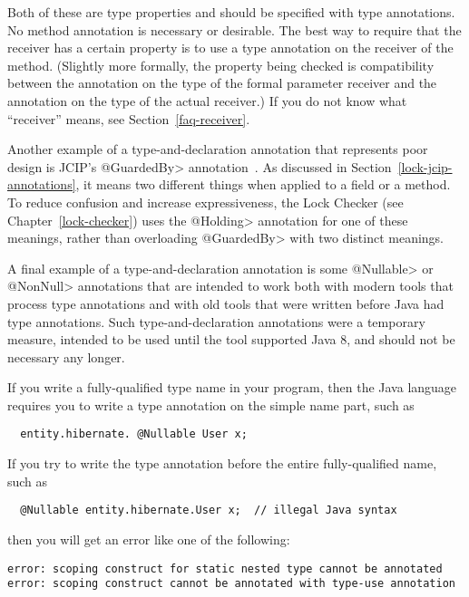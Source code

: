 Both of these are type properties and should be specified with type
annotations.  No method annotation is necessary or desirable.  The best way
to require that the receiver has a certain property is to use a type
annotation on the receiver of the method.  (Slightly more formally, the
property being checked is compatibility between the annotation on the type
of the formal parameter receiver and the annotation on the type of the
actual receiver.)  If you do not know what ``receiver'' means, see
Section~\ref{faq-receiver}.

Another example of a type-and-declaration annotation that represents poor
design is JCIP's \<@GuardedBy> annotation~\cite{Goetz2006}.  As discussed
in Section~\ref{lock-jcip-annotations}, it means two different things when
applied to a field or a method.  To reduce confusion and increase
expressiveness, the Lock Checker (see Chapter~\ref{lock-checker}) uses the
\<@Holding> annotation for one of these meanings, rather than overloading
\<@GuardedBy> with two distinct meanings.


A final example of a type-and-declaration annotation is some \<@Nullable>
or \<@NonNull> annotations that are intended to work both with modern tools
that process type annotations and with old tools that were written before
Java had type annotations.  Such type-and-declaration annotations were a
temporary measure, intended to be used until the tool supported Java 8, and
should not be necessary any longer.



If you write a fully-qualified type name in your program, then the Java
language requires you to write a type annotation on the simple name part,
such as
\begin{Verbatim}
  entity.hibernate. @Nullable User x;
\end{Verbatim}

If you try to write the type annotation before the entire fully-qualified
name, such as
\begin{Verbatim}
  @Nullable entity.hibernate.User x;  // illegal Java syntax
\end{Verbatim}
\noindent
then you will get an error like one of the following:
\begin{Verbatim}
error: scoping construct for static nested type cannot be annotated
error: scoping construct cannot be annotated with type-use annotation
\end{Verbatim}


